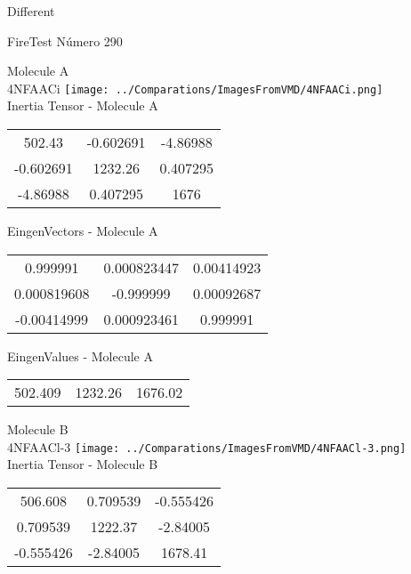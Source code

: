 \begin{center}
\vtab
\vtab
\textcolor{NavyBlue}{\Large Different}
\end{center}

 \newpage

\vtab[-2cm]
\begin{center}
{\large FireTest \tab Número 290}
\end{center}
\begin{multicols}{2}
\begin{center}

Molecule A \\ 
4NFAACi
\texttt{[image: ../Comparations/ImagesFromVMD/4NFAACi.png]}
\\
Inertia Tensor - Molecule A \\
\vtab

\begin{tabular}{|c c c|}
502.43	 & 	-0.602691	 & 	-4.86988	 \\
-0.602691	 & 	1232.26	 & 	0.407295	 \\
-4.86988	 & 	0.407295	 & 	1676
\end{tabular}

\vtab
 EingenVectors - Molecule A     \\
\vtab
\begin{tabular}{|c c c|}
0.999991	 & 	0.000823447	 & 	0.00414923	 \\
0.000819608	 & 	-0.999999	 & 	0.00092687	 \\
-0.00414999	 & 	0.000923461	 & 	0.999991
\end{tabular}

\vtab
 EingenValues - Molecule A     \\
\vtab
\begin{tabular}{|c c c|}
502.409	 & 	1232.26	 & 	1676.02	 \\
\end{tabular}
\columnbreak

Molecule B \\ 
4NFAACl-3
\texttt{[image: ../Comparations/ImagesFromVMD/4NFAACl-3.png]}
\\
Inertia Tensor - Molecule B \\
\vtab

\begin{tabular}{|c c c|}
506.608	 & 	0.709539	 & 	-0.555426	 \\
0.709539	 & 	1222.37	 & 	-2.84005	 \\
-0.555426	 & 	-2.84005	 & 	1678.41
\end{tabular}


\end{center}
\end{multicols}
